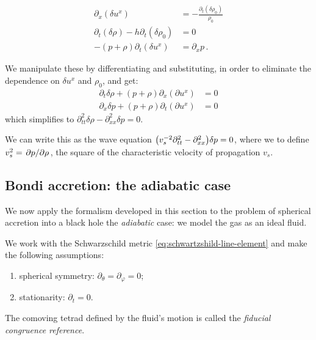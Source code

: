 \documentclass[main.tex]{subfiles}
\begin{document}
\begin{subequations}
\begin{align}
  \partial_x (\delta u^x) &= -\frac{\partial_t (\delta \rho_0)}{\rho_0}  \\
  \partial_t (\delta \rho) - h \partial_t (\delta \rho_0) &= 0  \\
  -(p+ \rho) \partial_t (\delta u^x) &= \partial_x p \,.
\end{align}
\end{subequations}

We manipulate these by differentiating and substituting, in order to eliminate the dependence on \(\delta u^x\) and \(\rho_0\), and get:
\begin{subequations}
\begin{align}
  \partial_t \delta \rho + (p+\rho) \partial_x (\partial u^x) &= 0 \\
  \partial_x \delta p + (p+\rho) \partial_t (\partial u^x) &= 0
\end{align}
\end{subequations}
which simplifies to \(\partial_{tt}^2 \delta \rho - \partial_{xx}^2 \delta p = 0\).

We can write this as the wave equation \(\qty(v_s^{-2} \partial_{tt}^2 - \partial_{xx}^2 ) \delta p = 0\), where we to define \(v_s^2 = \pdv*{p}{\rho}\), the square of the characteristic velocity of propagation \(v_s\).

\subsection{Bondi accretion: the adiabatic case}

We now apply the formalism developed in this section to the problem of spherical accretion into a black hole the \emph{adiabatic} case: we model the gas as an ideal fluid.

We work with the Schwarzschild metric \eqref{eq:schwartzshild-line-element} and make the following assumptions:

\begin{enumerate}
  \item spherical symmetry: \(\partial_\theta = \partial_\varphi = 0\);
  \item stationarity: \(\partial_t = 0\).
\end{enumerate}

The comoving tetrad defined by the fluid's motion is called the \emph{fiducial congruence reference}.
\end{document}
